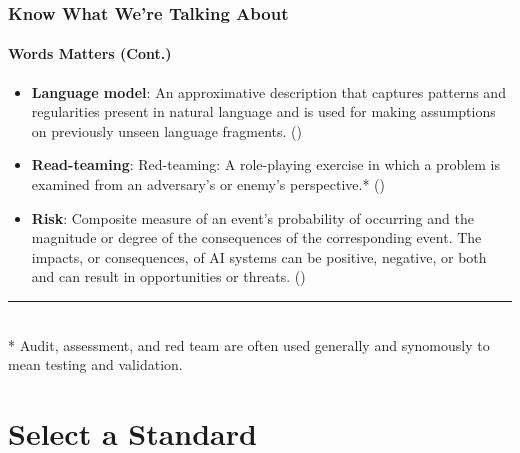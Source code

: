 \documentclass[11pt,
               aspectratio=169,
               hyperref={colorlinks}
               ]{beamer}
\begin{document}
		\begin{frame}
			
			\frametitle{Know What We're Talking About}
			\framesubtitle{Words Matters (Cont.)}
			
			\begin{itemize}
				
				\item \textbf{Language model}: An approximative description that captures patterns and regularities present in natural language and is used for making assumptions on previously unseen language fragments. (\cite{atherton2023language})

				\item \textbf{Read-teaming}: Red-teaming: A role-playing exercise in which a problem is examined from an adversary’s or enemy’s perspective.* (\cite{atherton2023language})

				
				\item \textbf{Risk}: Composite measure of an event’s probability of occurring and the magnitude or degree of the consequences of the corresponding event. The impacts, or consequences, of AI systems can be positive, negative, or both and can result in opportunities or threats. (\cite{atherton2023language})

			\end{itemize}
			
			\vspace{10pt}
			\par\noindent\rule{100pt}{0.4pt}\\
			\vspace{5pt}
			\scriptsize{* Audit, assessment, and red team are often used generally and synomously to mean testing and validation.}
		
		\end{frame}



	\section{Select a Standard}
\end{document}
